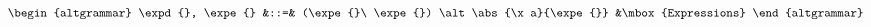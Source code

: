 \documentclass{sigplanconf}
\begin{document}
\begin{figure*}
$$
\begin{altgrammar}
  \expd{}, \expe{} &::=& (\expe{}\ \expe{}) \alt \abs{\x a}{\expe{}}
                &\mbox{Expressions}
\end{altgrammar}
$$
\end{figure*}



%

%


%
%
%
%
%
\end{document}
